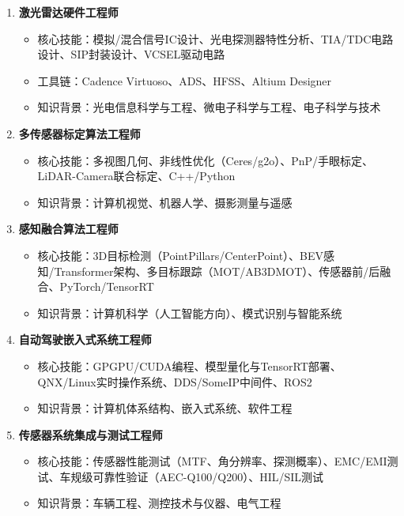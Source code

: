 \documentclass[12pt,a4paper,openany,UTF8]{ctexbook}
\begin{document}
\begin{enumerate}
    \item \textbf{激光雷达硬件工程师}
    \begin{itemize}
        \item 核心技能：模拟/混合信号IC设计、光电探测器特性分析、TIA/TDC电路设计、SIP封装设计、VCSEL驱动电路
        \item 工具链：Cadence Virtuoso、ADS、HFSS、Altium Designer
        \item 知识背景：光电信息科学与工程、微电子科学与工程、电子科学与技术
    \end{itemize}

    \item \textbf{多传感器标定算法工程师}
    \begin{itemize}
        \item 核心技能：多视图几何、非线性优化（Ceres/g2o）、PnP/手眼标定、LiDAR-Camera联合标定、C++/Python
        \item 知识背景：计算机视觉、机器人学、摄影测量与遥感
    \end{itemize}

    \item \textbf{感知融合算法工程师}
    \begin{itemize}
        \item 核心技能：3D目标检测（PointPillars/CenterPoint）、BEV感知/Transformer架构、多目标跟踪（MOT/AB3DMOT）、传感器前/后融合、PyTorch/TensorRT
        \item 知识背景：计算机科学（人工智能方向）、模式识别与智能系统
    \end{itemize}

    \item \textbf{自动驾驶嵌入式系统工程师}
    \begin{itemize}
        \item 核心技能：GPGPU/CUDA编程、模型量化与TensorRT部署、QNX/Linux实时操作系统、DDS/SomeIP中间件、ROS2
        \item 知识背景：计算机体系结构、嵌入式系统、软件工程
    \end{itemize}

    \item \textbf{传感器系统集成与测试工程师}
    \begin{itemize}
        \item 核心技能：传感器性能测试（MTF、角分辨率、探测概率）、EMC/EMI测试、车规级可靠性验证（AEC-Q100/Q200）、HIL/SIL测试
        \item 知识背景：车辆工程、测控技术与仪器、电气工程
    \end{itemize}
\end{enumerate}
\end{document}
